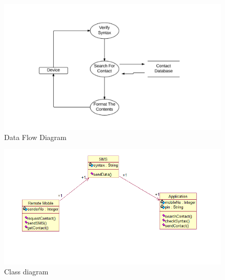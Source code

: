 	\begin{figure}[h!]
		\includegraphics[width=5.5in]{dfd.png} %
		\caption{Data Flow Diagram}
		\label{fig:4} %
		
	\end{figure} 

\begin{figure}[h!]
	\includegraphics[width=5.5in]{class.png} %
	\caption{Class diagram}
	\label{fig:6} %
	
\end{figure} 

